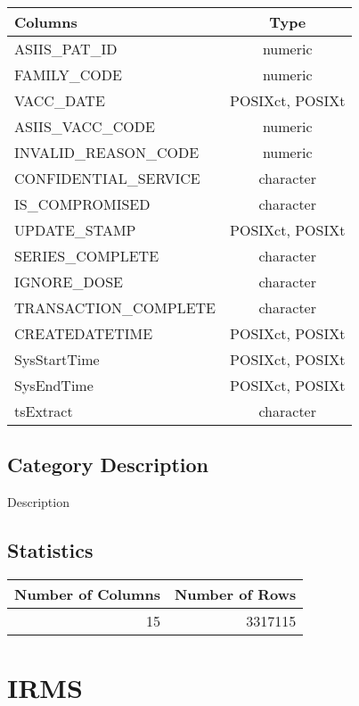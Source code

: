 \documentclass[
  letterpaper,
  DIV=11,
  numbers=noendperiod]{scrreprt}
\begin{document}
\begin{longtable}{lc}
\toprule
Columns & Type \\ 
\midrule
ASIIS\_PAT\_ID & numeric \\ 
FAMILY\_CODE & numeric \\ 
VACC\_DATE & POSIXct, POSIXt \\ 
ASIIS\_VACC\_CODE & numeric \\ 
INVALID\_REASON\_CODE & numeric \\ 
CONFIDENTIAL\_SERVICE & character \\ 
IS\_COMPROMISED & character \\ 
UPDATE\_STAMP & POSIXct, POSIXt \\ 
SERIES\_COMPLETE & character \\ 
IGNORE\_DOSE & character \\ 
TRANSACTION\_COMPLETE & character \\ 
CREATEDATETIME & POSIXct, POSIXt \\ 
SysStartTime & POSIXct, POSIXt \\ 
SysEndTime & POSIXct, POSIXt \\ 
tsExtract & character \\ 
\bottomrule
\end{longtable}

\hypertarget{category-description-14}{%
\section*{Category Description}\label{category-description-14}}

Description

\hypertarget{statistics-14}{%
\section*{Statistics}\label{statistics-14}}

\begin{longtable}{rr}
\toprule
Number of Columns & Number of Rows \\ 
\midrule
15 & 3317115 \\ 
\bottomrule
\end{longtable}

\hypertarget{irms}{%
\chapter*{IRMS}\label{irms}}
\end{document}
